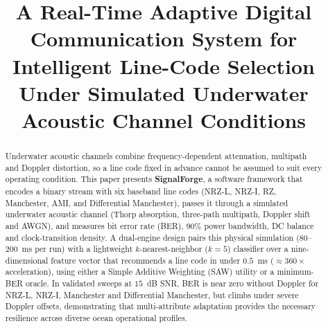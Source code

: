 \documentclass[conference]{IEEEtran}
\begin{document}
\title{A Real-Time Adaptive Digital Communication System for Intelligent Line-Code Selection Under Simulated Underwater Acoustic Channel Conditions}

\author{
    \and
    \and
}

\maketitle

\begin{abstract}
Underwater acoustic channels combine frequency-dependent attenuation, multipath and Doppler distortion, so a line code fixed in advance cannot be assumed to suit every operating condition. This paper presents \textbf{SignalForge}, a software framework that encodes a binary stream with six baseband line codes (NRZ-L, NRZ-I, RZ, Manchester, AMI, and Differential Manchester), passes it through a simulated underwater acoustic channel (Thorp absorption, three-path multipath, Doppler shift and AWGN), and measures bit error rate (BER), $90\%$ power bandwidth, DC balance and clock-transition density. A dual-engine design pairs this physical simulation ($80$--$200$~ms per run) with a lightweight $k$-nearest-neighbor ($k = 5$) classifier over a nine-dimensional feature vector that recommends a line code in under $0.5$~ms ($\approx 360\times$ acceleration), using either a Simple Additive Weighting (SAW) utility or a minimum-BER oracle. In validated sweeps at $15$~dB SNR, BER is near zero without Doppler for NRZ-L, NRZ-I, Manchester and Differential Manchester, but climbs under severe Doppler offsets, demonstrating that multi-attribute adaptation provides the necessary resilience across diverse ocean operational profiles.
\end{abstract}
\end{document}
